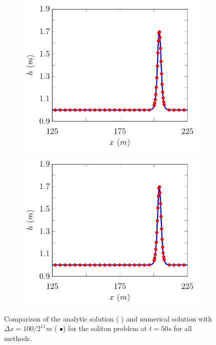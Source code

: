\begin{figure}
\begin{subfigure}{0.5\textwidth}
		\vspace{0.5cm}
	\end{subfigure}
	\begin{subfigure}{0.5\textwidth}
		\includegraphics[width=\textwidth]{./chp5/figures/Analytic/Soliton/Example/D.pdf}
		\vspace{0.5cm}
	\end{subfigure}%
	\begin{subfigure}{0.5\textwidth}
		\includegraphics[width=\textwidth]{./chp5/figures/Analytic/Soliton/Example/W.pdf}
		\vspace{0.5cm}
	\end{subfigure}
	\caption{Comparison of the analytic solution ({\color{blue} \solidrule}) and numerical solution with $\Delta x = {100} / {2^{11}}m$ ({\color{red} $\bullet$}) for the soliton problem at $t=50s$ for all methods.}
	\label{fig:SolitonExAll}
\end{figure}


